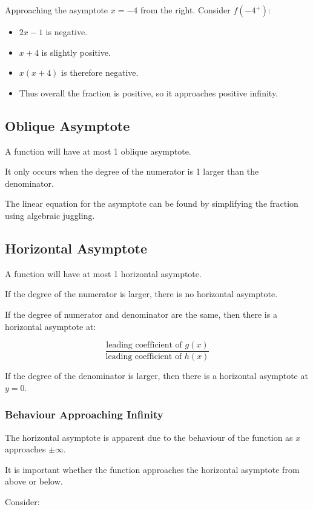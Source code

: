\documentclass[a4paper,11pt]{report}
\begin{document}
Approaching the asymptote $x = -4$ from the right. Consider $f(-4^+)$:

\begin{itemize}
\item $2x - 1$ is negative.
\item $x + 4$ is slightly positive.
\item $x(x + 4)$ is therefore negative.
\item Thus overall the fraction is positive, so it approaches positive infinity.
\end{itemize}

\subsection{Oblique Asymptote}

A function will have at most 1 oblique asymptote.

It only occurs when the degree of the numerator is 1 larger than the denominator.

The linear equation for the asymptote can be found by simplifying the fraction
using algebraic juggling.

\subsection{Horizontal Asymptote}

A function will have at most 1 horizontal asymptote.

If the degree of the numerator is larger, there is no horizontal asymptote.

If the degree of numerator and denominator are the same, then there is a
horizontal asymptote at:

$$
\frac{\text{leading coefficient of $g(x)$}}{\text{leading coefficient of $h(x)$}}
$$

If the degree of the denominator is larger, then there is a horizontal
asymptote at $y = 0$.

\subsubsection{Behaviour Approaching Infinity}

The horizontal asymptote is apparent due to the behaviour of the function as
$x$ approaches $\pm \infty$.

It is important whether the function approaches the horizontal asymptote from
above or below.

Consider:
\end{document}

